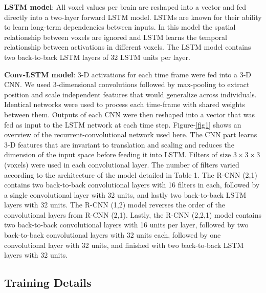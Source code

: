 \documentclass{article}
\begin{document}
\textbf{LSTM model}: All voxel values per brain are reshaped into a vector and fed directly into a two-layer forward LSTM model. LSTMs are known for their ability to learn long-term dependencies between inputs. In this model the spatial relationship between voxels are ignored and LSTM learns the temporal relationship between activations in different voxels. The LSTM model contains two back-to-back LSTM layers of 32 LSTM units per layer.

\textbf{Conv-LSTM model}: 3-D activations for each time frame were fed into a 3-D CNN. We used 3-dimensional convolutions followed by max-pooling to extract position and scale independent features that would generalize across individuals. Identical networks were used to process each time-frame with shared weights between them. Outputs of each CNN were then reshaped into a vector that was fed as input to the LSTM network at each time step. Figure-\ref{fig1} shows an overview of the recurrent-convolutional network used here. The CNN part learns 3-D features that are invariant to translation and scaling and reduces the dimension of the input space before feeding it into LSTM. Filters of size $3\times3\times3$ (voxels) were used in each convolutional layer. The number of filters varied according to the architecture of the model detailed in Table 1. 
The R-CNN (2,1) contains two back-to-back convolutional layers with 16 filters in each, followed by a single convolutional layer with 32 units, and lastly two back-to-back LSTM layers with 32 units. The R-CNN (1,2) model reverses the order of the convolutional layers from R-CNN (2,1). Lastly, the R-CNN (2,2,1) model contains two back-to-back convolutional layers with 16 units per layer, followed by two back-to-back convolutional layers with 32 units each, followed by one convolutional layer with 32 units, and finished with two back-to-back LSTM layers with 32 units. 

\subsection{Training Details}
\label{training_details}
\end{document}
